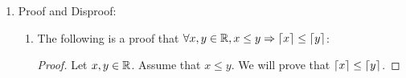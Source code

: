 \documentclass[12pt]{article}
\theoremstyle{definition}
\newtheorem{case}{Case}
\begin{document}
\begin{enumerate}
\begin{proof}
        \begin{case}[Even]
            If $x$ is an even integer, 2 must divide $x$, or $Even(x): x = 2k, k \in \Z$. We will evaluate each term in $\lfloor \frac{x+1}{2} \rfloor = \left \lceil \frac{x}{2} \right \rceil$ with $2k$ substituted for $x$ below:
            \begin{align*}
                \floor{\frac{x+1}{2}} &= \floor{\frac{(2k)+1}{2}}\\
                &= \floor{ k + \frac{1}{2}}\\
                &= k\\
                \\
                \ceil{\frac{x}{2}} &= \ceil{\frac{2k}{2}}\\
                &= \ceil{k}\\
                &= k
            \end{align*}
            Thus, $\forall\, x \in \Z, Even(x)$, \textbf{(3)} holds.
        \end{case}
        \begin{case}[Odd]
            If $x$ is an odd integer, $Odd(x): x = 2k - 1, k \in \Z$ must be true. We will evaluate each term in $\lfloor \frac{x+1}{2} \rfloor = \left \lceil \frac{x}{2} \right \rceil$ with $2k$ substituted for $x$ below:
            \begin{align*}
                \floor{\frac{x+1}{2}} &= \floor{\frac{(2k - 1)+1}{2}}\\
                &= \floor{ k }\\
                &= k\\
                \\
                \ceil{\frac{x}{2}} &= \ceil{\frac{2k-1}{2}}\\
                &= \ceil{k - \frac{1}{2}}\\
                &= k
            \end{align*}
            Thus, $\forall\, x \in \Z, Odd(x)$, \textbf{(3)} holds.
        \end{case}
        From \textbf{Case 1} and \textbf{Case 2}, we have shown that regardless of whether $x$ is even or odd, \textbf{(3)} holds.
    \end{proof}
    \item Proof and Disproof:
        \begin{enumerate}[i]
            \item The following is a proof that $\forall x, y \in \mathbb R, x \leq y \mathrel{\Rightarrow} \lceil x \rceil \leq \lceil y \rceil$:
            \begin{proof}
                Let $x, y \in \mathbb R$. Assume that $x \leq y$. We will prove that $\left \lceil x \right \rceil \leq \left \lceil y \right \rceil$.
                

\end{proof}
\end{enumerate}
\end{enumerate}
\end{document}
